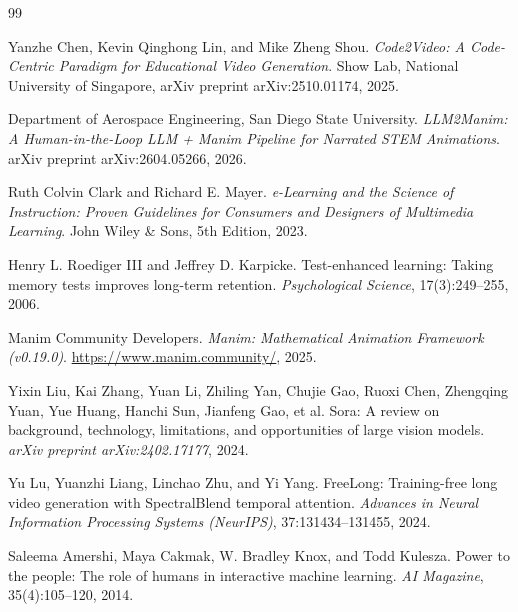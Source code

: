 \documentclass[11pt, a4paper]{article}
\begin{document}
\begin{thebibliography}{99}

Yanzhe Chen, Kevin Qinghong Lin, and Mike Zheng Shou.
\newblock \textit{Code2Video: A Code-Centric Paradigm for Educational Video Generation}.
\newblock Show Lab, National University of Singapore, arXiv preprint arXiv:2510.01174, 2025.

Department of Aerospace Engineering, San Diego State University.
\newblock \textit{LLM2Manim: A Human-in-the-Loop LLM + Manim Pipeline for Narrated STEM Animations}.
\newblock arXiv preprint arXiv:2604.05266, 2026.

Ruth Colvin Clark and Richard E. Mayer.
\newblock \textit{e-Learning and the Science of Instruction: Proven Guidelines for Consumers and Designers of Multimedia Learning}.
\newblock John Wiley \& Sons, 5th Edition, 2023.

Henry L. Roediger III and Jeffrey D. Karpicke.
\newblock Test-enhanced learning: Taking memory tests improves long-term retention.
\newblock \textit{Psychological Science}, 17(3):249--255, 2006.

Manim Community Developers.
\newblock \textit{Manim: Mathematical Animation Framework (v0.19.0)}.
\newblock \url{https://www.manim.community/}, 2025.

Yixin Liu, Kai Zhang, Yuan Li, Zhiling Yan, Chujie Gao, Ruoxi Chen, Zhengqing Yuan, Yue Huang, Hanchi Sun, Jianfeng Gao, et al.
\newblock Sora: A review on background, technology, limitations, and opportunities of large vision models.
\newblock \textit{arXiv preprint arXiv:2402.17177}, 2024.

Yu Lu, Yuanzhi Liang, Linchao Zhu, and Yi Yang.
\newblock FreeLong: Training-free long video generation with SpectralBlend temporal attention.
\newblock \textit{Advances in Neural Information Processing Systems (NeurIPS)}, 37:131434--131455, 2024.

Saleema Amershi, Maya Cakmak, W. Bradley Knox, and Todd Kulesza.
\newblock Power to the people: The role of humans in interactive machine learning.
\newblock \textit{AI Magazine}, 35(4):105--120, 2014.

\end{thebibliography}
\end{document}
